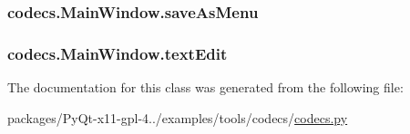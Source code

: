 \subsubsection[{save\+As\+Menu}]{\setlength{\rightskip}{0pt plus 5cm}codecs.\+Main\+Window.\+save\+As\+Menu}\label{classcodecs_1_1MainWindow_aa7a333e2cc8e8701ea2e4b69621743b5}
\hypertarget{classcodecs_1_1MainWindow_ab13016d698308085abaf443fc43c7db6}{}
\subsubsection[{text\+Edit}]{\setlength{\rightskip}{0pt plus 5cm}codecs.\+Main\+Window.\+text\+Edit}\label{classcodecs_1_1MainWindow_ab13016d698308085abaf443fc43c7db6}


The documentation for this class was generated from the following file\+:\begin{DoxyCompactItemize}
\item 
packages/\+Py\+Qt-\/x11-\/gpl-\/4../examples/tools/codecs/\hyperlink{codecs_8py}{codecs.\+py}\end{DoxyCompactItemize}
